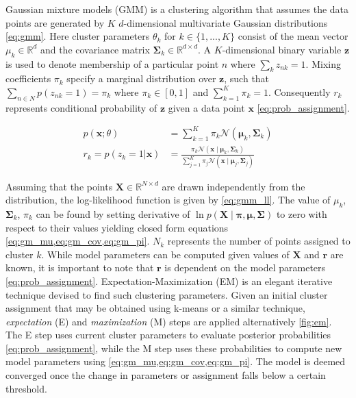 \begin{secDefinition}
Gaussian mixture models (GMM) is a clustering algorithm that assumes the data points are generated by $K$ $d$-dimensional multivariate Gaussian distributions \cref{eq:gmm}.
Here cluster parameters $\theta_k$ for $k \in \{1, ..., K\}$ consist of the mean vector $\mu_k \in \mathbb{R}^d$ and the covariance matrix $\boldsymbol{\Sigma}_k \in \mathbb{R}^{d\times d}$.
A $K$-dimensional binary variable $\mathbf{z}$ is used to denote membership of a particular point $n$ where $\sum_k z_{nk} = 1$.
Mixing coefficients $\pi_k$ specify a marginal distribution over $\mathbf{z}$, such that $\sum_{n \in N} p(z_{nk} = 1) = \pi_k$ where $\pi_k \in [0, 1]$ and $\sum^K_{k=1} \pi_k = 1$.
Consequently $r_k$ represents conditional probability of $\mathbf{z}$ given a data point $\mathbf{x}$ \cref{eq:prob_assignment}. 

\begin{align}
p(\mathbf{x}; \theta) &= \sum^K_{k=1} \pi_k \mathcal{N}(\boldsymbol{\mu}_k, \boldsymbol{\Sigma}_k)\label{eq:gmm} \\
r_k = p(z_k = 1 | \mathbf{x}) &= \frac{
    \pi_{k} \mathcal{N}\left(\mathbf{x} \mid \boldsymbol{\mu}_{k}, \boldsymbol{\Sigma}_{k}\right)
}{
    \sum_{j=1}^{K} \pi_{j} \mathcal{N}\left(\mathbf{x} \mid \boldsymbol{\mu}_{j}, \boldsymbol{\Sigma}_{j}\right)
} \label{eq:prob_assignment}
\end{align}

Assuming that the points $\mathbf{X} \in \mathbb{R}^{N \times d}$ are drawn independently from the distribution, the log-likelihood function is given by \cref{eq:gmm_ll}.
The value of $\mu_k$, $\mathbf{\Sigma}_k$, $\pi_k$ can be found by setting derivative of $\ln p(\mathbf{X} \mid \boldsymbol{\pi}, \boldsymbol{\mu}, \mathbf{\Sigma})$ to zero with respect to their values yielding closed form equations \cref{eq:gm_mu,eq:gm_cov,eq:gm_pi}.
$N_k$ represents the number of points assigned to cluster $k$.
While model parameters can be computed given values of $\mathbf{X}$ and $\mathbf{r}$ are known, it is important to note that $\mathbf{r}$ is dependent on the model parameters \cref{eq:prob_assignment}.
Expectation-Maximization (EM) is an elegant iterative technique devised to find such clustering parameters.
Given an initial cluster assignment that may be obtained using k-means or a similar technique, \textit{expectation} (E) and \textit{maximization} (M) steps are applied alternatively \cref{fig:em}.
The E step uses current cluster parameters to evaluate posterior probabilities \cref{eq:prob_assignment}, while the M step uses these probabilities to compute new model parameters using \cref{eq:gm_mu,eq:gm_cov,eq:gm_pi}.
The model is deemed converged once the change in parameters or assignment falls below a certain threshold.


\end{secDefinition}
